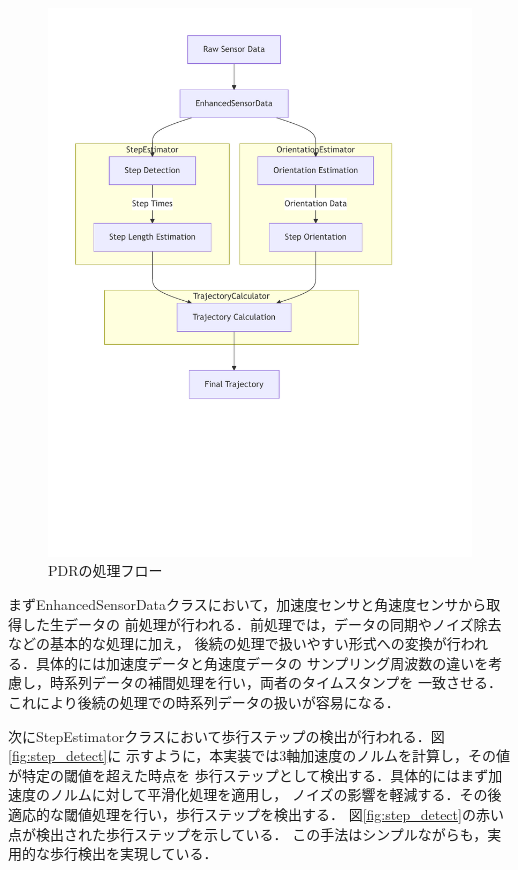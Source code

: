 \begin{figure}[ht]
    \centering
    \includegraphics[width=\linewidth]{image/pdr-flow-diagram.pdf}
    \caption{PDRの処理フロー}
    \label{fig:pdr-flow}
\end{figure}

まずEnhancedSensorDataクラスにおいて，加速度センサと角速度センサから取得した生データの
前処理が行われる．前処理では，データの同期やノイズ除去などの基本的な処理に加え，
後続の処理で扱いやすい形式への変換が行われる．具体的には加速度データと角速度データの
サンプリング周波数の違いを考慮し，時系列データの補間処理を行い，両者のタイムスタンプを
一致させる．これにより後続の処理での時系列データの扱いが容易になる．

次にStepEstimatorクラスにおいて歩行ステップの検出が行われる．図\ref{fig:step_detect}に
示すように，本実装では3軸加速度のノルムを計算し，その値が特定の閾値を超えた時点を
歩行ステップとして検出する．具体的にはまず加速度のノルムに対して平滑化処理を適用し，
ノイズの影響を軽減する．その後適応的な閾値処理を行い，歩行ステップを検出する．
図\ref{fig:step_detect}の赤い点が検出された歩行ステップを示している．
この手法はシンプルながらも，実用的な歩行検出を実現している．

